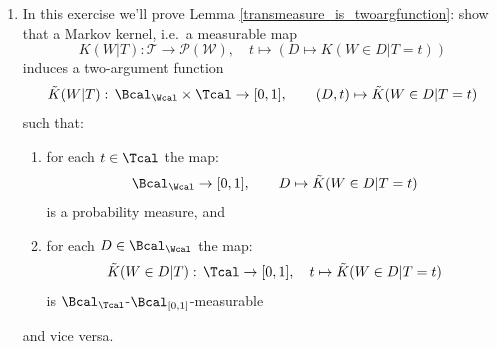 \begin{enumerate}
    The bottom line, to be used in exercise \ref{ex:markov_kernel_is_bivariate_function}, is that measurability can be tested on sets which generate the $\sigma$-algebra of the codomain. %

    \emph{Hint: Show that $\mathcal{B} \subseteq f_*\mathcal{B}_{\mathcal{X}}$, where $f_*\mathcal{B}_{\mathcal{X}}$ is defined as in Definition/Lemma \ref*{sigma-algebra-map} in the appendix.
    Deduce that $\mathcal{B}_{\mathcal{Y}} \subseteq f_* \mathcal{B}_{\mathcal{X}}$.
    Deduce from that, in turn, that $f$ is $\mathcal{B}_{\mathcal{X}}$-$\mathcal{B}_{\mathcal{Y}}$-measurable.}

    \begin{ungradedsolution}
        Recall that
        \begin{equation*}
            f_* \mathcal{B}_{\mathcal{X}} = \{A \subseteq \mathcal{Y} \mid f^{-1}(A) \in \mathcal{B}_{\mathcal{X}}\}.
            \label{eq:recall_definition}
        \end{equation*}
        Since we have $f^{-1}(B) \in \mathcal{B}_{\mathcal{X}}$ for all $B \in \mathcal{B}$ by assumption, we obtain $\mathcal{B} \subseteq f_* \mathcal{B}_{\mathcal{X}}$.
        Now, since $f_* \mathcal{B}_{\mathcal{X}}$ is a $\sigma$-algebra containing $\mathcal{B}$, and since $\mathcal{B}_{\mathcal{Y}}$ is by definition the smallest $\sigma$-algebra containing $\mathcal{B}$, we obtain $\mathcal{B}_{\mathcal{Y}} \subseteq f_* \mathcal{B}_{\mathcal{X}}$.
        By definition of $f_* \mathcal{B}_{\mathcal{X}}$, again, this means that for all $B \in \mathcal{B}_{\mathcal{Y}}$ we have $f^{-1}(B) \in \mathcal{B}_{\mathcal{X}}$.
        This, in turn, means that $f$ is $\mathcal{B}_{\mathcal{X}}$-$\mathcal{B}_{\mathcal{Y}}$-measurable, proving the claim.
    \end{ungradedsolution}

    \item \label{ex:markov_kernel_is_bivariate_function} %
    In this exercise we'll prove Lemma \ref*{transmeasure_is_twoargfunction}: show that a Markov kernel, i.e.\ a measurable map
    \[ K(W|T): \mathcal{T}\rightarrow \mathcal{P}(\mathcal{W}), \quad t\mapsto (D\mapsto K(W\in D|T=t)) \]
    induces a two-argument function
    \[ \tilde K(W|T):\, \Bcal_\Wcal \times \Tcal \to [0,1], \qquad (D,t) \mapsto \tilde K(W \in D|T=t) \]
    such that:
    \begin{enumerate}[label=\roman*)]
        \item for each $t \in \Tcal$ the map:
        \[ \Bcal_\Wcal \to [0,1],\qquad D \mapsto \tilde K(W\in D|T=t)\]
        is a probability measure, and
        \item for each $D \in \Bcal_\Wcal$ the map:
        \[ \tilde K(W \in D|T):\, \Tcal \to [0,1],\quad t \mapsto \tilde K(W \in D|T=t) \]
        is $\Bcal_\Tcal$-$\Bcal_{[0,1]}$-measurable
    \end{enumerate}
    and vice versa.


\end{enumerate}
